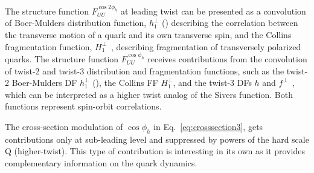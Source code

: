\documentclass[aps,prl,twocolumn,showpacs,superscriptaddress,groupedaddress]{revtex4-1}  %
\newcommand{\ph}{\phi_h}
\begin{document}
The structure function $F^{\cos 2\ph}_{UU}$ at leading twist can be presented as a convolution of Boer-Mulders distribution function, $h_1^\perp$ (\cite{Boer:1997nt}) describing the correlation between the transverse motion
of a quark and its own transverse spin, and  the Collins fragmentation function, $H_1^{\perp}$~\cite{Collins:1992kk}, describing fragmentation of transversely polarized quarks.
The structure function $F^{\cos \ph}_{UU}$  receives contributions 
from the convolution of twist-2 and twist-3 distribution and fragmentation functions,
such as the twist-2 Boer-Mulders DF $h_1^\perp$ (\cite{Boer:1997nt,Pasquini:2010af}), the Collins FF $H_1^{\perp}$, and the twist-3 DFs $h$ and $f^\perp$~\cite{Bacchetta:2006tn}, which can be interpreted as a higher twist analog of the Sivers function. Both functions represent spin-orbit correlations. 

The cross-section modulation of  $\cos \phi_h $ in Eq.~\ref{eq:crosssection3}, gets contributions only
at sub-leading level and suppressed by powers of the hard scale Q (higher-twist).
This type of contribution is interesting in its own as it provides complementary information
on the quark dynamics.
\end{document}
